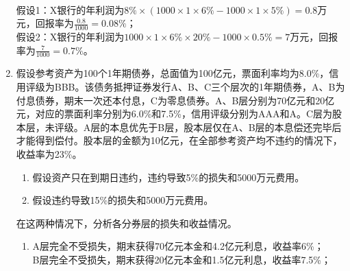 \begin{enumerate}
    \sol\\
    假设1：X银行的年利润为$8\% \times (1000 \times 1 \times 6\% - 1000 \times 1 \times 5\%) = 0.8$万元，回报率为$\displaystyle \frac{0.8}{1000} = 0.08\%$；\\
    假设2：X银行的年利润为$1000 \times 1 \times 6\% \times 20\% - 1000 \times 0.5\% = 7$万元，回报率为$\displaystyle \frac{7}{1000} = 0.7\%$。
    \item 假设参考资产为100个1年期债券，总面值为100亿元，票面利率均为8.0\%，信用评级为BBB。该债务抵押证券发行A、B、C三个层次的1年期债券，A、B为付息债券，期末一次还本付息，C为零息债券。A、B层分别为70亿元和20亿元，对应的票面利率分别为6.0\%和7.5\%，信用评级分别为AAA和A。C层为股本层，未评级。A层的本息优先于B层，股本层仅在A、B层的本息偿还完毕后才能得到偿付。股本层的金额为10亿元，在全部参考资产均不违约的情况下，收益率为23\%。
    \begin{center}
    \end{center}
    \begin{enumerate}[label=(\arabic*)]
        \item 假设资产只在到期日违约，违约导致5\%的损失和5000万元费用。
        \item 假设违约导致15\%的损失和5000万元费用。
    \end{enumerate}
    在这两种情况下，分析各分券层的损失和收益情况。\\
    \sol
    \begin{enumerate}[label=(\arabic*)]
        \item A层完全不受损失，期末获得70亿元本金和4.2亿元利息，收益率6\%；\\
        B层完全不受损失，期末获得20亿元本金和1.5亿元利息，收益率7.5\%；\\

\end{enumerate}
\end{enumerate}
